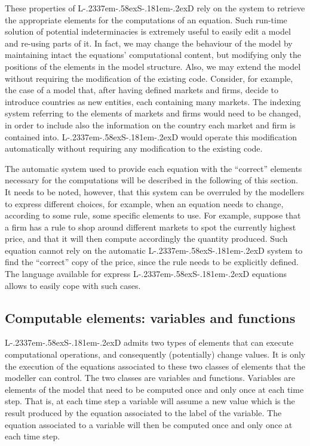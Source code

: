 \documentclass [11pt,a4paper] {book}
\def\LsD{{L\kern-.2337em\lower-.58ex\hbox{S}\kern-.181em\lower-.2ex\hbox{D}}\xspace}
\begin{document}
These properties of \LsD rely on the system to retrieve the appropriate elements for the computations of an equation. Such run-time solution of potential indeterminacies is extremely useful to easily edit a model and re-using parts of it. In fact, we may change the behaviour of the model by maintaining intact the equations' computational content, but modifying only the positions of the elements in the model structure. Also, we may extend the model without requiring the modification of the existing code. Consider, for example, the case of a model that, after having defined markets and firms, decide to introduce countries as new entities, each containing many markets. The indexing system referring to the elements of markets and firms would need to be changed, in order to include also the information on the country each market and firm is contained into. \LsD would operate this modification automatically without requiring any modification to the existing code.

The automatic system used to provide each equation with the ``correct'' elements necessary for the computations will be described in the following of this section. It needs to be noted, however, that this system can be overruled by the modellers to express different choices, for example, when an equation needs to change, according to some rule, some specific elements to use. For example, suppose that a firm has a rule to shop around different markets to spot the currently highest price, and that it will then compute accordingly the quantity produced. Such equation cannot rely on the automatic \LsD system to find the ``correct'' copy of the price, since the rule needs to be explicitly defined. The language available for express \LsD equations allows to easily cope with such cases.


\subsection{Computable elements: variables and functions}

\LsD admits two types of elements that can execute computational operations, and consequently (potentially) change values. It is only the execution of the equations associated to these two classes of elements that the modeller can control. The two classes are variables and functions. Variables are elements of the model that need to be computed once and only once at each time step. That is, at each time step a variable will assume a new value which is the result produced by the equation associated to the label of the variable. The equation associated to a variable will then be computed once and only once at each time step.
\end{document}
